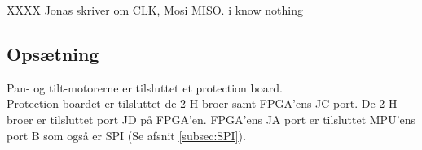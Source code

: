 XXXX Jonas skriver om CLK, Mosi MISO. i know nothing


\subsection{Opsætning}
Pan- og tilt-motorerne er tilsluttet et protection board.\\
Protection boardet er tilsluttet de 2 H-broer samt FPGA'ens JC port.
De 2 H-broer er tilsluttet port JD på FPGA'en.
FPGA'ens JA port er tilsluttet MPU'ens port B som også er SPI (Se afsnit \ref{subsec:SPI}).